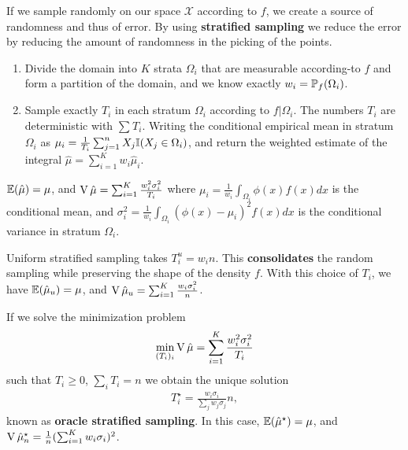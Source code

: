 \begin{defn}
  \label{sec:monte-carlo-method-6}
  If we sample randomly on our space $\mathcal{X}$ according to $f$,
  we create a source of randomness and thus of error.  By using
  \textbf{stratified sampling} we reduce the error by reducing the
  amount of randomness in the picking of the points.

  \begin{enumerate}
  \item Divide the domain into $K$ strata $\Omega_{i}$ that are
    measurable according-to $f$ and form a partition of the domain, and
    we know exactly $w_{i} = \Prob_{f}(\Omega_{i})$.
  \item Sample exactly $T_{i}$ in each stratum $\Omega_{i}$ according
    to $f | \Omega_{i}$.  The numbers $T_{i}$ are deterministic with
    $\sum_{}^{} T_{i}$.  Writing the conditional empirical mean in
    stratum $\Omega_{i}$ as $\mu_{i} = \frac{1}{T_{i}} \sum_{j=1}^{n}
    X_{j} \I{X_{j} \in \Omega_{i}}$, and return the weighted estimate
    of the integral $\hat \mu = \sum_{i=1}^{K} w_{i} \hat \mu_{i}$.
  \end{enumerate}
\end{defn}

\begin{thm}
  \label{sec:monte-carlo-method-7}
  $\E{\hat \mu} = \mu$, and $\operatorname*{V} \hat \mu = \sum_{i=1}^{K}
  \frac{w_{i}^{2} \sigma^{2}_{i}}{T_{i}} $ where $\mu_{i} =
  \frac{1}{w_{i}} \int_{\Omega_{i}} \phi(x) f(x) dx$ is the
  conditional mean, and $\sigma^{2}_{i} = \frac{1}{w_{i}}
  \int_{\Omega_{i}}^{} (\phi(x) - \mu_{i})^{2} f(x) dx $ is the
  conditional variance in stratum $\Omega_{i}$.
\end{thm}

\begin{defn}
  \label{sec:monte-carlo-method-8}
  Uniform stratified sampling takes $T_{i}^{u} = w_{i} n$.  This
  \textbf{consolidates} the random sampling while preserving the shape
  of the density $f$.  With this choice of $T_{i}$, we have $\E{\hat
    \mu_{u}} = \mu$, and $\operatorname*{V} \hat \mu_{u} = \sum_{i=1}^{K} \frac{w_{i}
  \sigma_{i}^{2}}{n}$.
\end{defn}

\begin{thm}
  \label{sec:monte-carlo-method-9}
  If we solve the minimization problem
  \begin{align}
    \label{eq:5}
    \min_{(T_{i})_{i}} \operatorname*{V} \hat \mu = \sum_{i=1}^{K} \frac{w_{i}^{2}
      \sigma_{i}^{2}}{T_{i}}
  \end{align} such that $T_{i} \geq 0$, $\sum_{i}^{} T_{i} = n$
  we obtain the unique solution
  \begin{align}
    \label{eq:6}
    T_{i}^{\star} = \frac{w_{i} \sigma_{i}}{\sum_{j}^{} w_{j}
      \sigma_{j}} n,
  \end{align} known as \textbf{oracle stratified sampling}.  In this
  case, $\E{\hat \mu^{\star}} = \mu$, and $\operatorname*{V} \hat \mu^{\star}_{n} =
  \frac{1}{n} (\sum_{i=1}^{K} w_{i} \sigma_{i})^{2}$.
\end{thm}


